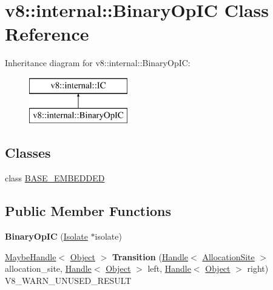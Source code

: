 \hypertarget{classv8_1_1internal_1_1_binary_op_i_c}{}\section{v8\+:\+:internal\+:\+:Binary\+Op\+I\+C Class Reference}
\label{classv8_1_1internal_1_1_binary_op_i_c}
Inheritance diagram for v8\+:\+:internal\+:\+:Binary\+Op\+I\+C\+:\begin{figure}[H]
\begin{center}
\leavevmode
\includegraphics[height=2.000000cm]{classv8_1_1internal_1_1_binary_op_i_c}
\end{center}
\end{figure}
\subsection*{Classes}
\begin{DoxyCompactItemize}
\item 
class \hyperlink{classv8_1_1internal_1_1_binary_op_i_c_1_1_b_a_s_e___e_m_b_e_d_d_e_d}{B\+A\+S\+E\+\_\+\+E\+M\+B\+E\+D\+D\+E\+D}
\end{DoxyCompactItemize}
\subsection*{Public Member Functions}
\begin{DoxyCompactItemize}
\item 
\hypertarget{classv8_1_1internal_1_1_binary_op_i_c_ae4f88986c6728e0ce24b2d1e4a7c9eee}{}{\bfseries Binary\+Op\+I\+C} (\hyperlink{classv8_1_1internal_1_1_isolate}{Isolate} $\ast$isolate)\label{classv8_1_1internal_1_1_binary_op_i_c_ae4f88986c6728e0ce24b2d1e4a7c9eee}

\item 
\hypertarget{classv8_1_1internal_1_1_binary_op_i_c_a9705646d9e97765a4f1ec2808510c99b}{}\hyperlink{classv8_1_1internal_1_1_maybe_handle}{Maybe\+Handle}$<$ \hyperlink{classv8_1_1internal_1_1_object}{Object} $>$ {\bfseries Transition} (\hyperlink{classv8_1_1internal_1_1_handle}{Handle}$<$ \hyperlink{classv8_1_1internal_1_1_allocation_site}{Allocation\+Site} $>$ allocation\+\_\+site, \hyperlink{classv8_1_1internal_1_1_handle}{Handle}$<$ \hyperlink{classv8_1_1internal_1_1_object}{Object} $>$ left, \hyperlink{classv8_1_1internal_1_1_handle}{Handle}$<$ \hyperlink{classv8_1_1internal_1_1_object}{Object} $>$ right) V8\+\_\+\+W\+A\+R\+N\+\_\+\+U\+N\+U\+S\+E\+D\+\_\+\+R\+E\+S\+U\+L\+T\label{classv8_1_1internal_1_1_binary_op_i_c_a9705646d9e97765a4f1ec2808510c99b}

\end{DoxyCompactItemize}
